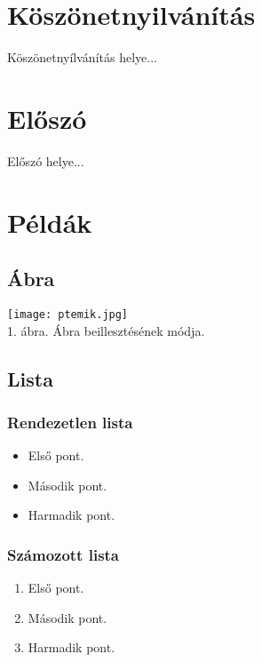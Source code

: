 \documentclass[oneside,a4paper,9pt]{article}
\begin{document}
	\pagebreak
	\setcounter{page}{1}
	\tableofcontents
	
	\pagebreak
	
	\setcounter{page}{1}
	
	\section{Köszönetnyilvánítás}
	Köszönetnyílvánítás helye...
	
	\pagebreak
	
	\section{Előszó}
	Előszó helye...
	\pagebreak
	
	\section{Példák}
	
	\subsection{Ábra}
	
	\begin{center}
		\texttt{[image: ptemik.jpg]}\\
		1. ábra. Ábra beillesztésének módja.\\
	\end{center}
	
	\subsection{Lista}
	
	\subsubsection{Rendezetlen lista}
	\begin{itemize}
		\item Első pont.
		\item Második pont.
		\item Harmadik pont.
	\end{itemize}
	
	\subsubsection{Számozott lista}
	\begin{enumerate}
		\item Első pont.
		\item Második pont.
		\item Harmadik pont.
	\end{enumerate}
	
\end{document}
